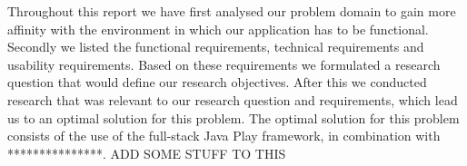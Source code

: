 Throughout this report we have first analysed our problem domain to gain more affinity with the environment in which our application has to be functional. Secondly we listed the functional requirements, technical requirements and usability requirements. Based on these requirements we formulated a research question that would define our research objectives. After this we conducted research that was relevant to our research question and requirements, which lead us to an optimal solution for this problem.
The optimal solution for this problem consists of the use of the full-stack Java Play framework, in combination with ***************. ADD SOME STUFF TO THIS
